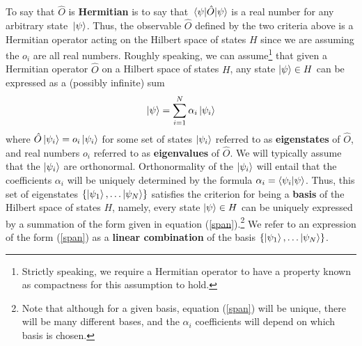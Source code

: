To say that $\hat{O}$ is \textbf{Hermitian} is to say that $\ev*{\hat{O}}{\psi}$ is a real number for any arbitrary state $\ket*{\psi}$. Thus, the observable $\hat{O}$ defined by the two criteria above is a Hermitian operator acting on the Hilbert space of states $H$ since we are assuming the $o_i$ are all real numbers. Roughly speaking, we can assume\footnote{Strictly speaking, we require a Hermitian operator to have a property known as compactness for this assumption to hold.}  that given a Hermitian operator $\hat{O}$ on a Hilbert space of states $H$, any state $\ket{\psi}\in H$ can be expressed as a (possibly infinite) sum 
\begin{equation}\label{span}
\ket{\psi}=\sum_{i=1}^N\alpha_i\ket{\psi_i}
\end{equation}
where $\hat{O}\ket{\psi_i}=o_i\ket{\psi_i}$ for some set of states $\ket{\psi_i}$ referred to as \textbf{eigenstates} of $\hat{O}$, and real numbers $o_i$ referred to as \textbf{eigenvalues} of $\hat{O}$. We will typically assume that the $\ket{\psi_i}$ are orthonormal. Orthonormality of the $\ket{\psi_i}$ will entail that the coefficients $\alpha_i$ will be uniquely determined by the formula $\alpha_i=\ip{\psi_i}{\psi}$. Thus, this set of eigenstates $\{\ket{\psi_1},\ldots\ket{\psi_N}\}$ satisfies the criterion for being a \textbf{basis} of the Hilbert space of states $H$, namely, every state $\ket{\psi}\in H$ can be uniquely expressed by a summation of the form given in equation (\ref{span}).\footnote{Note that although for a given basis, equation (\ref{span}) will be unique, there will be many different bases, and the $\alpha_i$ coefficients will depend on which basis is chosen.} We refer to an expression of the form (\ref{span}) as a \textbf{linear combination} of the basis $\{\ket{\psi_1},\ldots\ket{\psi_N}\}$. 
